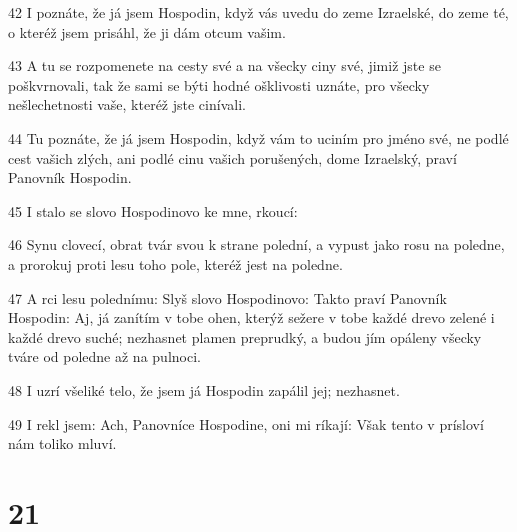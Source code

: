 \par 42 I poznáte, že já jsem Hospodin, když vás uvedu do zeme Izraelské, do zeme té, o kteréž jsem prisáhl, že ji dám otcum vašim.
\par 43 A tu se rozpomenete na cesty své a na všecky ciny své, jimiž jste se poškvrnovali, tak že sami se býti hodné ošklivosti uznáte, pro všecky nešlechetnosti vaše, kteréž jste cinívali.
\par 44 Tu poznáte, že já jsem Hospodin, když vám to uciním pro jméno své, ne podlé cest vašich zlých, ani podlé cinu vašich porušených, dome Izraelský, praví Panovník Hospodin.
\par 45 I stalo se slovo Hospodinovo ke mne, rkoucí:
\par 46 Synu clovecí, obrat tvár svou k strane polední, a vypust jako rosu na poledne, a prorokuj proti lesu toho pole, kteréž jest na poledne.
\par 47 A rci lesu polednímu: Slyš slovo Hospodinovo: Takto praví Panovník Hospodin: Aj, já zanítím v tobe ohen, kterýž sežere v tobe každé drevo zelené i každé drevo suché; nezhasnet plamen preprudký, a budou jím opáleny všecky tváre od poledne až na pulnoci.
\par 48 I uzrí všeliké telo, že jsem já Hospodin zapálil jej; nezhasnet.
\par 49 I rekl jsem: Ach, Panovníce Hospodine, oni mi ríkají: Však tento v prísloví nám toliko mluví.

\chapter{21}

